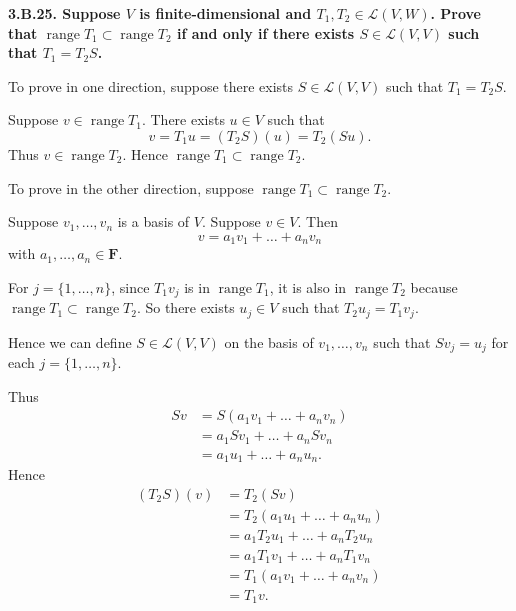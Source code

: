 \documentclass[a5paper]{article}
\begin{document}
\newcommand   \C           {\mathbf{C}}
\newcommand   \R           {\mathbf{R}}
\renewcommand \L           {\mathcal{L}}
\newcommand   \F           {\mathbf{F}}
\renewcommand \P           {\mathcal{P}}
\newcommand   \question[1] {\textbf{\boldmath#1\unboldmath}\par}
\newcommand   \op          {\operatorname}

\question{
    3.B.25.
    Suppose $V$ is finite-dimensional and $T_1,T_2 \in \L(V, W)$.
    Prove that $\op{range}T_1 \subset \op{range}T_2$ if and only if there exists $S \in \L(V, V)$ such that $T_1=T_2S$.
}

    To prove in one direction, suppose there exists $S \in \L(V, V)$ such that $T_1=T_2S$.

    Suppose $v \in \op{range}T_1$.
    There exists $u \in V$ such that
\begin{equation*}
        v = T_1u = (T_2S)(u) = T_2(Su) .
\end{equation*}
    Thus $v \in \op{range}T_2$.
    Hence $\op{range}T_1 \subset \op{range}T_2$.

    To prove in the other direction, suppose $\op{range}T_1 \subset \op{range}T_2$.

    Suppose $v_1,\dots,v_n$ is a basis of $V$.
    Suppose $v \in V$.
    Then
\begin{equation*}
        v = a_1v_1 + \dots + a_nv_n
\end{equation*}
    with $a_1,\dots,a_n \in \F$.

    For $j=\{1,\dots,n\}$, since $T_1v_j$ is in $\op{range}T_1$, it is also in $\op{range}T_2$ because $\op{range}T_1 \subset \op{range}T_2$.
    So there exists $u_j \in V$ such that $T_2u_j = T_1v_j$.

    Hence we can define $S \in \L(V,V)$ on the basis of $v_1,\dots,v_n$ such that $Sv_j = u_j$ for each $j=\{1,\dots,n\}$.

    Thus
\begin{align*}
        Sv &= S(a_1v_1 + \dots + a_nv_n) \\
           &= a_1Sv_1 + \dots + a_nSv_n \\
           &= a_1u_1 + \dots + a_nu_n .
\end{align*}
    Hence
\begin{align*}
        (T_2S)(v) &= T_2(Sv) \\
                  &= T_2(a_1u_1 + \dots + a_nu_n) \\
                  &= a_1T_2u_1 + \dots + a_nT_2u_n \\
                  &= a_1T_1v_1 + \dots + a_nT_1v_n \\
                  &= T_1(a_1v_1 + \dots + a_nv_n) \\
                  &= T_1v .
\end{align*}
\end{document}
